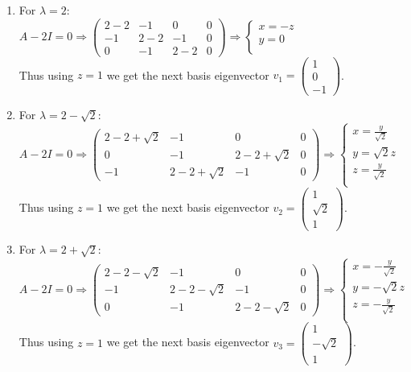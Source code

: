 \documentclass{article}
\begin{document}
	\begin{enumerate}
		\item For $\lambda=2$:\\
		$
		A-2I=0 \Rightarrow
		\left(\begin{array}{ccc|c}
		2-2 & -1 & 0 & 0 \\ 
		-1 & 2-2 & -1 & 0\\ 
		0 & -1 & 2-2 & 0
		\end{array}\right)
		\Rightarrow \left\{
		\begin{array}{cc}
		x=-z\\
		y=0\\
		\end{array}\right.
		$\\
		Thus using $z=1$ we get the next basis eigenvector $v_1=\begin{pmatrix}1 \\0\\ -1\end{pmatrix}$.

		\item For $\lambda=2-\sqrt{2}$:\\
		$
		A-2I=0 \Rightarrow
		\left(\begin{array}{ccc|c}
		2-2+\sqrt{2} & -1 & 0 & 0 \\
		0 & -1 & 2-2+\sqrt{2} & 0 \\
		-1 & 2-2+\sqrt{2} & -1 & 0 
		\end{array}\right)
		\Rightarrow \left\{
		\begin{array}{cc}
		x=\frac{y}{\sqrt{2}}\\
		y=\sqrt{2}z\\
		z=\frac{y}{\sqrt{2}}\\
		\end{array}\right.
		$\\
		Thus using $z=1$ we get the next basis eigenvector $v_2=\begin{pmatrix}1 \\\sqrt{2}\\ 1\end{pmatrix}$.
		
		\item For $\lambda=2+\sqrt{2}$:\\
		$
		A-2I=0 \Rightarrow
		\left(\begin{array}{ccc|c}
		2-2-\sqrt{2} & -1 & 0 & 0 \\ 
		-1 & 2-2-\sqrt{2} & -1 & 0\\ 
		0 & -1 & 2-2-\sqrt{2} & 0
		\end{array}\right)
		\Rightarrow \left\{
		\begin{array}{cc}
		x=-\frac{y}{\sqrt{2}}\\
		y=-\sqrt{2}z\\
		z=-\frac{y}{\sqrt{2}}\\
		\end{array}\right.
		$\\
		Thus using $z=1$ we get the next basis eigenvector $v_3=\begin{pmatrix}1 \\-\sqrt{2} \\ 1\end{pmatrix}$.
	\end{enumerate}
\end{document}
